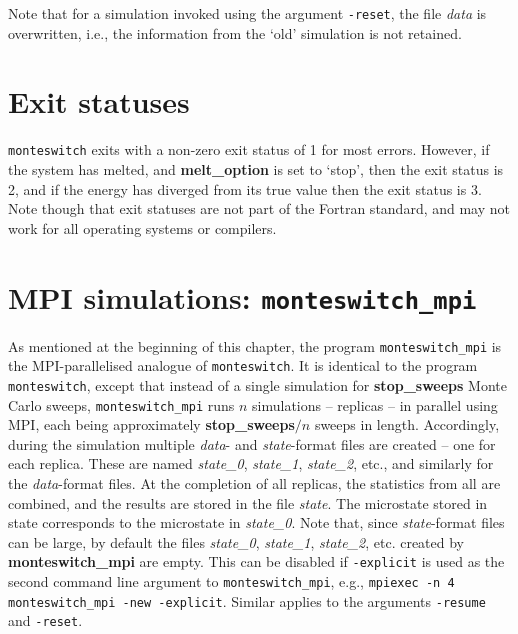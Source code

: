 \documentclass{report}
\begin{document}
Note that for a simulation invoked using the argument \texttt{-reset}, the file \emph{data} is overwritten, i.e., the information from the `old'
simulation is not retained.

\section{Exit statuses}
\texttt{monteswitch} exits with a non-zero exit status of 1 for most errors. However, if the system has melted, and \textbf{melt\_option} is set to
`stop', then the exit status is 2, and if the energy has diverged from its true value then the exit status is 3. 
Note though that exit statuses are not part of the Fortran standard, and may not work for all operating systems or compilers. 

\section{MPI simulations: \texttt{monteswitch\_mpi}}
As mentioned at the beginning of this chapter, the program \texttt{monteswitch\_mpi} is the MPI-parallelised analogue of \texttt{monteswitch}. 
It is identical to the program \texttt{monteswitch}, except that instead of a single simulation for \textbf{stop\_sweeps} Monte Carlo sweeps, 
\texttt{monteswitch\_mpi} runs $n$ simulations -- replicas -- in parallel using MPI, each being approximately \textbf{stop\_sweeps}$/n$ sweeps in 
length. Accordingly, during the simulation multiple \emph{data}- and \emph{state}-format files are created -- one for each replica. These 
are named \emph{state\_0}, \emph{state\_1}, \emph{state\_2}, etc., and similarly for the \emph{data}-format files. At the completion of 
all replicas, the statistics from all are combined, and the results are stored in the file \emph{state}. The microstate stored in state
corresponds to the microstate in \emph{state\_0}. 
Note that, since \emph{state}-format files can be large, by default the files \emph{state\_0}, \emph{state\_1}, 
\emph{state\_2}, etc. created by \textbf{monteswitch\_mpi} are empty. This can be disabled if \texttt{-explicit} is used as the second command line 
argument to \texttt{monteswitch\_mpi}, e.g., \texttt{mpiexec -n 4 monteswitch\_mpi -new -explicit}. Similar applies to the arguments \texttt{-resume} and 
\texttt{-reset}.
\end{document}

